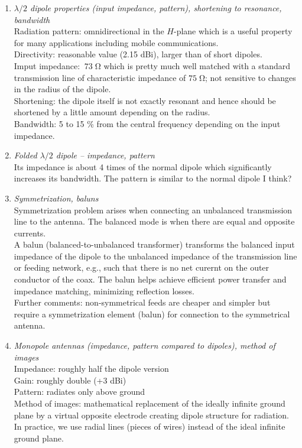 \documentclass[11pt,a4paper]{article}
\renewcommand{\ohm}{{\mathrm{\Omega}}}
\begin{document}
\begin{enumerate}
    \item \emph{$\lambda/2$ dipole properties (input impedance, pattern), shortening to resonance, bandwidth}\\
    Radiation pattern: omnidirectional in the $H$-plane which is a useful property for many applications including mobile communications.\\
    Directivity: reasonable value (2.15 dBi), larger than of short dipoles.\\
    Imput impedance: $~73 \; \ohm$ which is pretty much well matched with a standard transmission line of characteristic impedance of $75 \; \ohm$; not sensitive to changes in the radius of the dipole.\\
    Shortening: the dipole itself is not exactly resonant and hence should be shortened by a little amount depending on the radius.\\
    Bandwidth: 5 to 15 \% from the central frequency depending on the input impedance.

    \item \emph{Folded $\lambda/2$ dipole -- impedance, pattern}\\
    Its impedance is about 4 times of the normal dipole which significantly increases its bandwidth. The pattern is similar to the normal dipole I think?

    \item \emph{Symmetrization, baluns}\\
    Symmetrization problem arises when connecting an unbalanced transmission line to the antenna. The balanced mode is when there are equal and opposite currents.\\
    A balun (balanced-to-unbalanced transformer) transforms the balanced input impedance of the dipole to the unbalanced impedance of the transmission line or feeding network, e.g., such that there is no net curernt on the outer conductor of the coax. The balun helps achieve efficient power transfer and impedance matching, minimizing reflection losses.\\
    Further comments: non-symmetrical feeds are cheaper and simpler but require a symmetrization element (balun) for connection to the symmetrical antenna.

    \item \emph{Monopole antennas (impedance, pattern compared to dipoles), method of images}\\
    Impedance: roughly half the dipole version\\
    Gain: roughly double (+3 dBi)\\
    Pattern: radiates only above ground\\
    Method of images: mathematical replacement of the ideally infinite ground plane by a virtual opposite electrode creating dipole structure for radiation. In practice, we use radial lines (pieces of wires) instead of the ideal infinite ground plane.


\end{enumerate}
\end{document}
